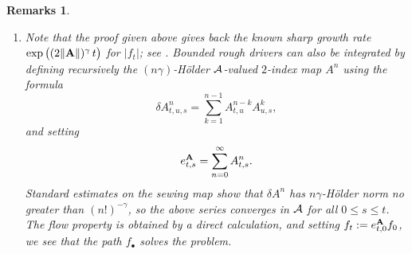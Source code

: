 \documentclass[11pt,a4paper]{amsart}
\renewcommand{\leq}{\leqslant}
\newcommand{\ssk}{\smallskip}
\newtheorem{rems}[thm]{{\sc Remarks}}
\numberwithin{equation}{section} %
\begin{document}
\ssk

\begin{rems}
\begin{enumerate}
   \item Note that the proof given above gives back the known sharp growth rate $\exp\big((2\| {\bf A}\|)^\gamma\,t\big)$ for $\big|f_t\big|$; see \cite{FrizOberhauser}. Bounded rough drivers can also be integrated by defining recursively the $(n\gamma)$-H\"older $\mathcal{A}$-valued $2$-index map $A^n$ using the formula
$$
\delta A^n_{t, u, s} = \sum_{k = 1}^{n - 1} A^{n - k}_{t, u} A^k_{u, s},
$$
and setting 
$$
e^{\bf A}_{t, s} = \sum_{n = 0}^{\infty} A^n_{t, s}.
$$ 
Standard estimates on the sewing map \cite{Gubinelli04} show that $\delta A^n$ has $n \gamma$-H\"older norm  no greater than $(n!)^{- \gamma}$, so the above series converges in $\mathcal{A}$ for all $0 \leq s \leq t$. The flow property is obtained by a direct calculation, and setting $f_t := e^{\bf A}_{t, 0} f_0$, we see that the path $f_\bullet$ solves the problem.   \vspace{0.2cm}


\end{enumerate}
\end{rems}
\end{document}
